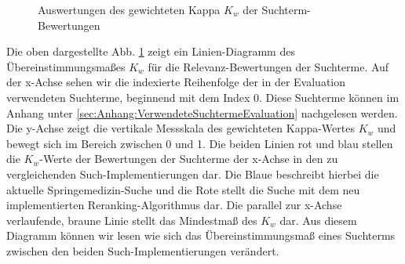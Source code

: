 
\begin{figure}[H]
\centering 
\vspace{-1.5em}
\caption[Auswertungen des gewichteten Kappa $K_w$ der Suchterm-Bewertungen]{Auswertungen des gewichteten Kappa $K_w$ der Suchterm-Bewertungen}
\label{fig:Evaluation:Auswertung:Kappas}

\footnotesize
{}\kappas
\pgfsetplotmarksize{.5pt}
  

\vspace{-2.5em}
\end{figure}

Die oben dargestellte Abb. \ref{fig:Evaluation:Auswertung:Kappas} zeigt ein Linien-Diagramm des Übereinstimmungsmaßes $K_w$ für die Relevanz-Bewertungen der Suchterme. Auf der x-Achse sehen wir die indexierte Reihenfolge der in der Evaluation verwendeten Suchterme, beginnend mit dem Index 0. Diese Suchterme können im Anhang unter \ref{sec:Anhang:VerwendeteSuchtermeEvaluation} nachgelesen werden. Die y-Achse zeigt die vertikale Messskala des gewichteten Kappa-Wertes $K_w$ und bewegt sich im Bereich zwischen 0 und 1. Die beiden Linien rot und blau stellen die $K_w$-Werte der Bewertungen der Suchterme der x-Achse in den zu vergleichenden Such-Implementierungen dar. Die Blaue beschreibt hierbei die aktuelle Springemedizin-Suche und die Rote stellt die Suche mit dem neu implementierten Reranking-Algorithmus dar. Die parallel zur x-Achse verlaufende, braune Linie stellt das Mindestmaß des $K_w$ dar. Aus diesem Diagramm können wir lesen wie sich das Übereinstimmungsmaß eines Suchterms zwischen den beiden Such-Implementierungen verändert. 

